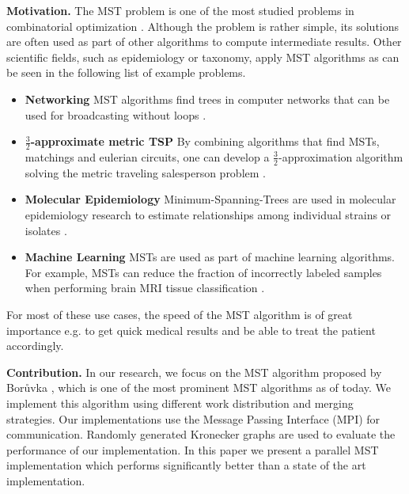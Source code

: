 \documentclass[letterpaper]{article}
\newcommand{\mypar}[1]{{\bf #1.}}
\begin{document}
\mypar{Motivation}
%
%
The MST problem is one of the most studied problems in combinatorial optimization \cite{graham1985history}. Although the
problem is rather simple, its solutions are often used as part of other algorithms to compute intermediate results.
Other scientific fields, such as epidemiology or taxonomy, apply MST algorithms as can be seen in the following list of
example problems.
\begin{itemize}
  \item \textbf{Networking} MST algorithms find trees in computer networks that can be used for broadcasting without
    loops \cite{reverse_path_broadcast}.
  \item \textbf{$\frac{3}{2}$-ap\-prox\-i\-mate metric TSP} By combining algorithms that find MSTs, matchings and
    eulerian circuits, one can develop a $\frac{3}{2}$-ap\-prox\-i\-mation algorithm solving the metric traveling
    salesperson problem \cite{christofides1976worst}.
  \item \textbf{Molecular Epidemiology} Minimum-Spanning-Trees are used in molecular epidemiology research to estimate
    relationships among individual strains or isolates \cite{spada2004use, salipante2011inadequacies}.
  \item \textbf{Machine Learning} MSTs are used as part of machine learning algorithms. For example, MSTs can reduce the
    fraction of incorrectly labeled samples when performing brain MRI tissue classification \cite{cocosco2003fully}.
\end{itemize}
For most of these use cases, the speed of the MST algorithm is of great importance e.g. to get quick medical results and
be able to treat the patient accordingly.

\mypar{Contribution}
In our research, we focus on the MST algorithm proposed by Bor\r{u}vka \cite{boruuvka1926jistem, nevsetvril2001otakar},
which is one of the most prominent MST algorithms as of today. We implement this algorithm using different work
distribution and merging strategies. Our implementations use the Message Passing Interface (MPI) for communication.
Randomly generated Kronecker graphs are used to evaluate the performance of our implementation. In this paper we present
a parallel MST implementation which performs significantly better than a state of the art implementation.
\end{document}
